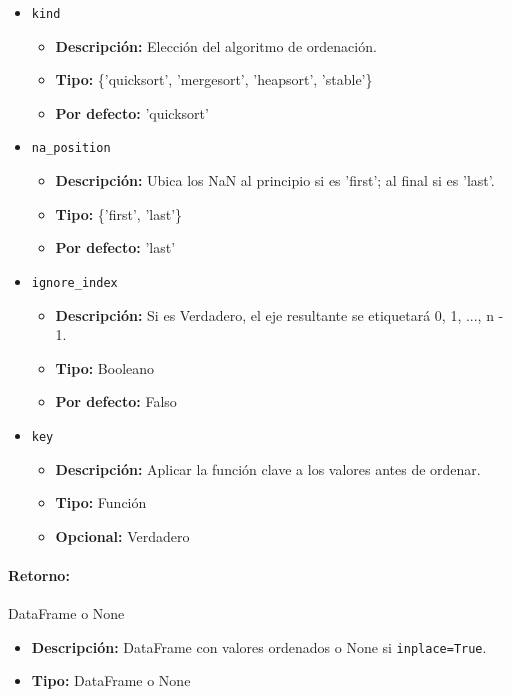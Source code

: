 \begin{itemize}
            \item \texttt{kind}
                \begin{itemize}
                    \item \textbf{Descripción:} Elección del algoritmo de ordenación.
                    \item \textbf{Tipo:} \{'quicksort', 'mergesort', 'heapsort', 'stable'\}
                    \item \textbf{Por defecto:} 'quicksort'
                \end{itemize}

            \item \texttt{na\_position}
                \begin{itemize}
                    \item \textbf{Descripción:} Ubica los NaN al principio si es 'first'; al final si es 'last'.
                    \item \textbf{Tipo:} \{'first', 'last'\}
                    \item \textbf{Por defecto:} 'last'
                \end{itemize}

            \item \texttt{ignore\_index}
                \begin{itemize}
                    \item \textbf{Descripción:} Si es Verdadero, el eje resultante se etiquetará 0, 1, ..., n - 1.
                    \item \textbf{Tipo:} Booleano
                    \item \textbf{Por defecto:} Falso
                \end{itemize}

            \item \texttt{key}
                \begin{itemize}
                    \item \textbf{Descripción:} Aplicar la función clave a los valores antes de ordenar.
                    \item \textbf{Tipo:} Función
                    \item \textbf{Opcional:} Verdadero
                \end{itemize}
        \end{itemize}

        \paragraph{Retorno:} DataFrame o None
        \begin{itemize}
            \item \textbf{Descripción:} DataFrame con valores ordenados o None si \texttt{inplace=True}.
            \item \textbf{Tipo:} DataFrame o None
        \end{itemize}


